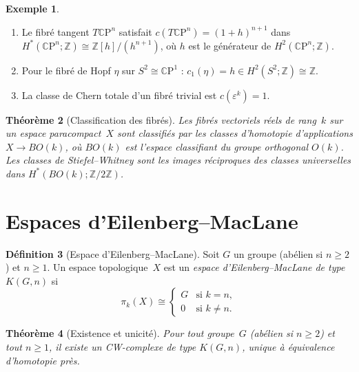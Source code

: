 \documentclass[12pt,a4paper,openany]{book}
\theoremstyle{definition}
\newtheorem{definition}{Définition}[chapter]
\newtheorem{exemple}[definition]{Exemple}
\theoremstyle{plain}
\newtheorem{theoreme}[definition]{Théorème}
\theoremstyle{remark}
\newcommand{\Z}{\mathbb{Z}}
\newcommand{\CP}{\mathbb{C}\mathrm{P}}
\begin{document}
\begin{exemple}\label{ex:classes-chern-calculs}
  \begin{enumerate}[label=(\roman*)]
    \item Le fibré tangent $T\CP^n$ satisfait $c(T\CP^n) = (1 + h)^{n+1}$
          dans $H^*(\CP^n; \Z) \cong \Z[h]/(h^{n+1})$, où $h$ est le générateur
          de $H^2(\CP^n; \Z)$.
    \item Pour le fibré de Hopf $\eta$ sur $S^2 \cong \CP^1$ :
          $c_1(\eta) = h \in H^2(S^2; \Z) \cong \Z$.
    \item La classe de Chern totale d'un fibré trivial est $c(\varepsilon^k) = 1$.
  \end{enumerate}
\end{exemple}

\begin{theoreme}[Classification des fibrés]\label{thm:classification-fibres}
  Les fibrés vectoriels réels de rang~$k$ sur un espace paracompact~$X$ sont
  classifiés par les classes d'homotopie d'applications $X \to BO(k)$, où $BO(k)$
  est l'espace classifiant du groupe orthogonal $O(k)$.
  Les classes de Stiefel--Whitney sont les images réciproques des classes universelles
  dans $H^*(BO(k); \Z/2\Z)$.
\end{theoreme}


\section{Espaces d'Eilenberg--MacLane}\label{sec:eilenberg-maclane}

\begin{definition}[Espace d'Eilenberg--MacLane]\label{def:eilenberg-maclane}
  Soit $G$ un groupe (abélien si $n \geq 2$) et $n \geq 1$. Un espace
  topologique~$X$ est un \emph{espace d'Eilenberg--MacLane de type $K(G, n)$} si
  \[
    \pi_k(X) \cong
    \begin{cases}
      G & \text{si } k = n, \\
      0 & \text{si } k \neq n.
    \end{cases}
  \]
\end{definition}

\begin{theoreme}[Existence et unicité]\label{thm:em-existence}
  Pour tout groupe~$G$ (abélien si $n \geq 2$) et tout $n \geq 1$, il existe un
  CW-complexe de type $K(G, n)$, unique à équivalence d'homotopie près.
\end{theoreme}
\end{document}
